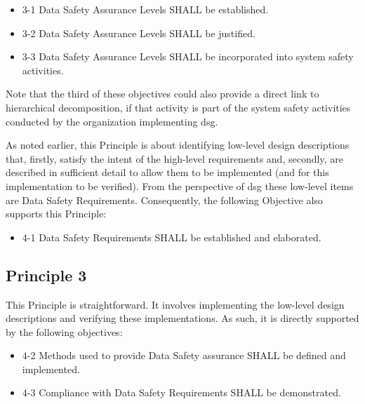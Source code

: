 \begin{itemize}
	\item \textcolor{dsiwgAccentColour}{3-1} Data Safety Assurance Levels SHALL be established.
	\item \textcolor{dsiwgAccentColour}{3-2} Data Safety Assurance Levels SHALL be justified.
	\item \textcolor{dsiwgAccentColour}{3-3} Data Safety Assurance Levels SHALL be incorporated into system safety activities.
\end{itemize}

Note that the third of these objectives could also provide a direct link to hierarchical decomposition, if that activity is part of the system safety activities conducted by the organization implementing \gls{dsg}.

As noted earlier, this Principle is about identifying low-level design descriptions that, firstly, satisfy the intent of the high-level requirements and, secondly, are described in sufficient detail to allow them to be implemented (and for this implementation to be verified). From the perspective of \gls{dsg} these low-level items are Data Safety Requirements. Consequently, the following Objective also supports this Principle:

\begin{itemize}
	\item \textcolor{dsiwgAccentColour}{4-1} Data Safety Requirements SHALL be established and elaborated.
\end{itemize}


\subsection{Principle 3}

This Principle is straightforward. It involves implementing the low-level design descriptions and verifying these implementations. As such, it is directly supported by the following objectives:

\begin{itemize}
	\item \textcolor{dsiwgAccentColour}{4-2} Methods used to provide Data Safety assurance SHALL be defined and implemented.
	\item \textcolor{dsiwgAccentColour}{4-3} Compliance with Data Safety Requirements SHALL be demonstrated.	
\end{itemize}


